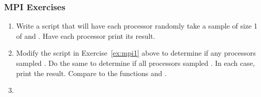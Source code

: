 \begin{frame}
\frametitle{MPI Exercises}
\begin{enumerate}
  \item Write a script that will have each processor randomly take a sample of
        size 1 of  and . Have each processor print its
        result.\label{ex:mpi1}

  \item Modify the script in Exercise~\ref{ex:mpi1} above to determine if any
  processors sampled . Do the same to determine if all processors 
  sampled . In each case, print the result. Compare to the functions 
   and .
  
  \item 
\end{enumerate}
\end{frame}